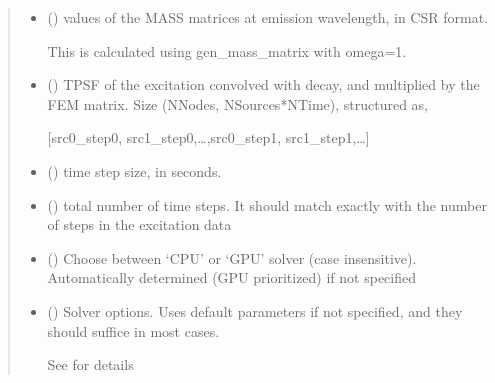\documentclass[letterpaper,10pt,english]{sphinxmanual}
\begin{document}
\begin{fulllineitems}
\begin{quote}
\begin{description}
\begin{itemize}
\item {} 
\sphinxAtStartPar
{} () \textendash{} 
\sphinxAtStartPar
values of the MASS matrices at emission wavelength, in CSR format.

\sphinxAtStartPar
This is calculated using gen\_mass\_matrix with omega=1.


\item {} 
\sphinxAtStartPar
{} () \textendash{} 
\sphinxAtStartPar
TPSF of the excitation convolved with decay, and multiplied by the FEM matrix. Size (NNodes, NSources*NTime), structured as,

\sphinxAtStartPar
{[}src0\_step0, src1\_step0,…,src0\_step1, src1\_step1,…{]}


\item {} 
\sphinxAtStartPar
{} () \textendash{} time step size, in seconds.

\item {} 
\sphinxAtStartPar
{} () \textendash{} total number of time steps. It should match exactly with the number of steps in the excitation data

\item {} 
\sphinxAtStartPar
{} (\sphinxstyleliteralemphasis{\sphinxupquote{, }}) \textendash{} Choose between ‘CPU’ or ‘GPU’ solver (case insensitive). Automatically determined (GPU prioritized) if not specified

\item {} 
\sphinxAtStartPar
{} ({\hyperref[\detokenize{_autosummary/nirfasterff.utils.SolverOptions:nirfasterff.utils.SolverOptions}]{}}\sphinxstyleliteralemphasis{\sphinxupquote{, }}) \textendash{} 
\sphinxAtStartPar
Solver options. Uses default parameters if not specified, and they should suffice in most cases.

\sphinxAtStartPar
See {\hyperref[\detokenize{_autosummary/nirfasterff.utils.SolverOptions:nirfasterff.utils.SolverOptions}]{}} for details



\end{itemize}
\end{description}
\end{quote}
\end{fulllineitems}
\end{document}

